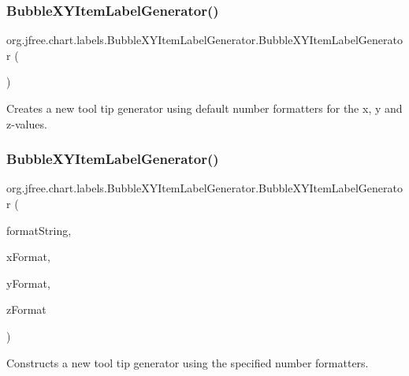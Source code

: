 \subsubsection{\texorpdfstring{Bubble\+X\+Y\+Item\+Label\+Generator()}{BubbleXYItemLabelGenerator()}\hspace{0.1cm}{\footnotesize\ttfamily [1/3]}}
{\footnotesize\ttfamily org.\+jfree.\+chart.\+labels.\+Bubble\+X\+Y\+Item\+Label\+Generator.\+Bubble\+X\+Y\+Item\+Label\+Generator (\begin{DoxyParamCaption}{ }\end{DoxyParamCaption})}

Creates a new tool tip generator using default number formatters for the x, y and z-\/values. \mbox{\label{classorg_1_1jfree_1_1chart_1_1labels_1_1_bubble_x_y_item_label_generator_a0c59a2c6964442e6fcaf16b916611a60}} 
\subsubsection{\texorpdfstring{Bubble\+X\+Y\+Item\+Label\+Generator()}{BubbleXYItemLabelGenerator()}\hspace{0.1cm}{\footnotesize\ttfamily [2/3]}}
{\footnotesize\ttfamily org.\+jfree.\+chart.\+labels.\+Bubble\+X\+Y\+Item\+Label\+Generator.\+Bubble\+X\+Y\+Item\+Label\+Generator (\begin{DoxyParamCaption}\item[{String}]{format\+String,  }\item[{Number\+Format}]{x\+Format,  }\item[{Number\+Format}]{y\+Format,  }\item[{Number\+Format}]{z\+Format }\end{DoxyParamCaption})}

Constructs a new tool tip generator using the specified number formatters.


